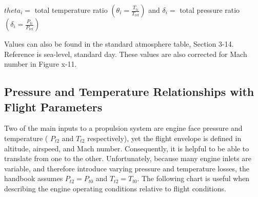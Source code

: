\documentclass[
]{book}
\begin{document}
\(theta_i =\) total temperature ratio
\(\left( \theta_i = \frac{T_{\mathrm{ti}}}{T_{\mathrm{ref}}} \right)\) and
\(\delta_i =\) total pressure ratio
\(\left( \delta_{i} = \frac{P_{\mathrm{ti}}}{P_{\mathrm{ref}}} \right)\)

Values can also be found in the standard atmosphere table, Section 3-14.
Reference is sea-level, standard day. These values are also corrected for Mach
number in Figure x-11.

\hypertarget{pressure-and-temperature-relationships-with-flight-parameters}{%
\subsection{Pressure and Temperature Relationships with Flight Parameters}\label{pressure-and-temperature-relationships-with-flight-parameters}}

Two of the main inputs to a propulsion system are engine face pressure and
temperature ( \(P­_{t2}\) and \(T_{t2}\) respectively), yet the flight envelope
is defined in altitude, airspeed, and Mach number. Consequently, it is helpful
to be able to translate from one to the other. Unfortunately, because many
engine inlets are variable, and therefore introduce varying pressure and
temperature losses, the handbook assumes \(P­_{t2} = P­_{t0}\) and \(T_{t2} = T_{t0}\).
The following chart is useful when describing the engine operating conditions
relative to flight conditions.
\end{document}
